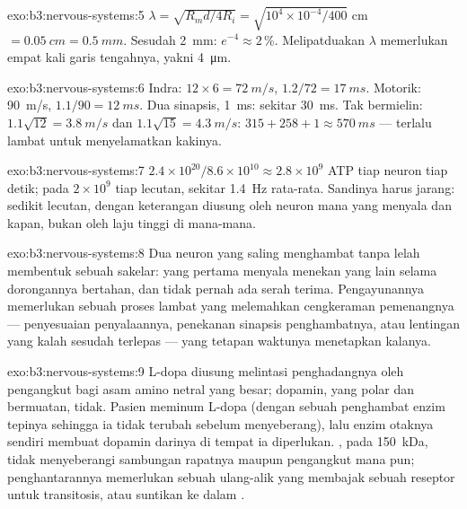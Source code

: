 \begin{solution}{exo:b3:nervous-systems:5}
$\lambda = \sqrt{R_{m}d/4R_{i}} = \sqrt{10^{4}\times 10^{-4}/400}$ cm
$= \qty{0.05}{cm} = \qty{0.5}{mm}$. Sesudah \qty{2}{mm}: $e^{-4} \approx
2\,\%$. Melipatduakan $\lambda$ memerlukan empat kali garis tengahnya, yakni
\qty{4}{\micro m}.
\end{solution}

\begin{solution}{exo:b3:nervous-systems:6}
Indra: $12\times 6 = \qty{72}{m/s}$, $1.2/72 = \qty{17}{ms}$. Motorik:
\qty{90}{m/s}, $1.1/90 = \qty{12}{ms}$. Dua sinapsis, \qty{1}{ms}: sekitar
\qty{30}{ms}. Tak bermielin: $1.1\sqrt{12} = \qty{3.8}{m/s}$ dan
$1.1\sqrt{15} = \qty{4.3}{m/s}$: $315 + 258 + 1 \approx \qty{570}{ms}$
--- terlalu lambat untuk menyelamatkan kakinya.
\end{solution}

\begin{solution}{exo:b3:nervous-systems:7}
$2.4\times 10^{20}/8.6\times 10^{10} \approx 2.8\times 10^{9}$ ATP tiap
neuron tiap detik; pada $2\times 10^{9}$ tiap lecutan, sekitar \qty{1.4}{Hz}
rata-rata. Sandinya harus jarang: sedikit lecutan, dengan keterangan diusung oleh
neuron mana yang menyala dan kapan, bukan oleh laju tinggi di mana-mana.
\end{solution}

\begin{solution}{exo:b3:nervous-systems:8}
Dua neuron yang saling menghambat tanpa lelah membentuk sebuah sakelar: yang
pertama menyala menekan yang lain selama dorongannya bertahan, dan
tidak pernah ada serah terima. Pengayunannya memerlukan sebuah proses lambat yang melemahkan
cengkeraman pemenangnya --- penyesuaian penyalaannya, penekanan sinapsis
penghambatnya, atau lentingan yang kalah sesudah terlepas --- yang
tetapan waktunya menetapkan kalanya.
\end{solution}

\begin{solution}{exo:b3:nervous-systems:9}
L-dopa diusung melintasi penghadangnya oleh pengangkut bagi asam amino netral
yang besar; dopamin, yang polar dan bermuatan, tidak. Pasien meminum
L-dopa (dengan sebuah penghambat enzim tepinya sehingga ia tidak
terubah sebelum menyeberang), lalu enzim otaknya sendiri membuat dopamin
darinya di tempat ia diperlukan. , pada \qty{150}{kDa}, tidak menyeberangi
sambungan rapatnya maupun pengangkut mana pun; penghantarannya memerlukan sebuah
ulang-alik yang membajak sebuah reseptor untuk transitosis, atau suntikan ke dalam
.
\end{solution}

